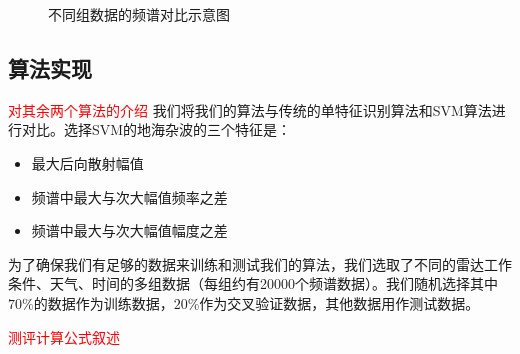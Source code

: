 \begin{figure}[!t]
{		\label{fig:case102405}}
	\caption{不同组数据的频谱对比示意图}
	\label{fig:group}
\end{figure}
\subsection{算法实现}
\textcolor{red}{对其余两个算法的介绍}
我们将我们的算法与传统的单特征识别算法和SVM算法进行对比。选择SVM的地海杂波的三个特征是：
\begin{itemize}
	\item 最大后向散射幅值
	\item 频谱中最大与次大幅值频率之差
	\item 频谱中最大与次大幅值幅度之差
\end{itemize}
为了确保我们有足够的数据来训练和测试我们的算法，我们选取了不同的雷达工作条件、天气、时间的多组数据（每组约有20000个频谱数据）。我们随机选择其中$70\%$的数据作为训练数据，$20\%$作为交叉验证数据，其他数据用作测试数据。

\textcolor{red}{测评计算公式叙述}

